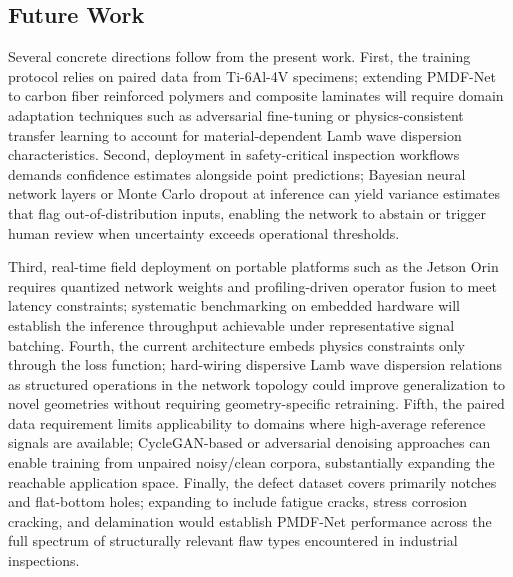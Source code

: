 \subsection{Future Work}
\label{sec:discussion-future}

Several concrete directions follow from the present work. First, the training protocol relies on paired data from Ti-6Al-4V specimens; extending PMDF-Net to carbon fiber reinforced polymers and composite laminates will require domain adaptation techniques such as adversarial fine-tuning or physics-consistent transfer learning to account for material-dependent Lamb wave dispersion characteristics. Second, deployment in safety-critical inspection workflows demands confidence estimates alongside point predictions; Bayesian neural network layers or Monte Carlo dropout at inference can yield variance estimates that flag out-of-distribution inputs, enabling the network to abstain or trigger human review when uncertainty exceeds operational thresholds.

Third, real-time field deployment on portable platforms such as the Jetson Orin requires quantized network weights and profiling-driven operator fusion to meet latency constraints; systematic benchmarking on embedded hardware will establish the inference throughput achievable under representative signal batching. Fourth, the current architecture embeds physics constraints only through the loss function; hard-wiring dispersive Lamb wave dispersion relations as structured operations in the network topology could improve generalization to novel geometries without requiring geometry-specific retraining. Fifth, the paired data requirement limits applicability to domains where high-average reference signals are available; CycleGAN-based or adversarial denoising approaches can enable training from unpaired noisy/clean corpora, substantially expanding the reachable application space. Finally, the defect dataset covers primarily notches and flat-bottom holes; expanding to include fatigue cracks, stress corrosion cracking, and delamination would establish PMDF-Net performance across the full spectrum of structurally relevant flaw types encountered in industrial inspections.

